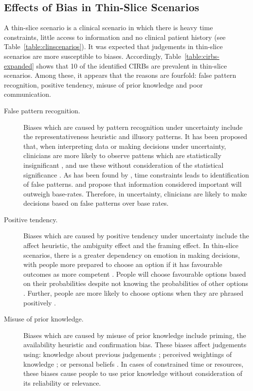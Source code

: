\documentclass[a4paper]{scrartcl}     %
\newcommand{\ignore}[1]{}
\begin{document}
  \subsection{Effects of Bias in Thin-Slice Scenarios}

    A thin-slice scenario is a clinical scenario in which there is heavy time constraints, little access to information and no clinical patient history (see Table~\ref{table:clinscenarios}). It was expected that judgements in thin-slice scenarios are more susceptible to biases. Accordingly, Table~\ref{table:cirbs-expanded} shows that 10 of the identified CIRBs are prevalent in thin-slice scenarios. Among these, it appears that the reasons are fourfold: false pattern recognition, positive tendency, misuse of prior knowledge and poor communication.

    \begin{description}
    \item[False pattern recognition.]
    Biases which are caused by pattern recognition under uncertainty include the representativeness heuristic\ignore{extension neglect, base rate neglect} and illusory patterns\ignore{and aggregate bias}. It has been proposed that, when interpreting data or making decisions under uncertainty, clinicians are more likely to observe pattens which are statistically insignificant \citep{Kahneman1974}, and use these without consideration of the statistical significance \citep{KahnemanDaniel2000}. As has been found by \citet{Bassili2000}, time constraints leads to identification of false patterns. \citet{Tversky1974} and \citet{Bar-Hillel1980} propose that information considered important will outweigh base-rates. Therefore, in uncertainty, clinicians are likely to make decisions based on false patterns over base rates.

    \item[Positive tendency.]
    Biases which are caused by positive tendency under uncertainty include the affect heuristic, the ambiguity effect\ignore{outcome bias} and the framing effect. In thin-slice scenarios, there is a greater dependency on emotion in making decisions, with people more prepared to choose an option if it has favourable outcomes as more competent \citep{Baron1988}. People will choose favourable options based on their probabilities despite not knowing the probabilities of other options \citep{Ellsberg1961a}. Further, people are more likely to choose options when they are phrased positively \citep{Tversky1981}.

    \item[Misuse of prior knowledge.]
    Biases which are caused by misuse of prior knowledge include priming,\ignore{order bias, contrast effect, posterior probability error, anchoring,} the availability heuristic and confirmation bias\ignore{observer-expectancy effect and the ascertainment bias}. These biases affect judgements using: knowledge about previous judgements \citep{Meyer1971,Kahneman1974}; perceived weightings of knowledge \citep{Tversky1973}; or personal beliefs \citep{Mahoney1977}. In cases of constrained time or resources, these biases cause people to use prior knowledge without consideration of its reliability or relevance.


\end{description}
\end{document}
